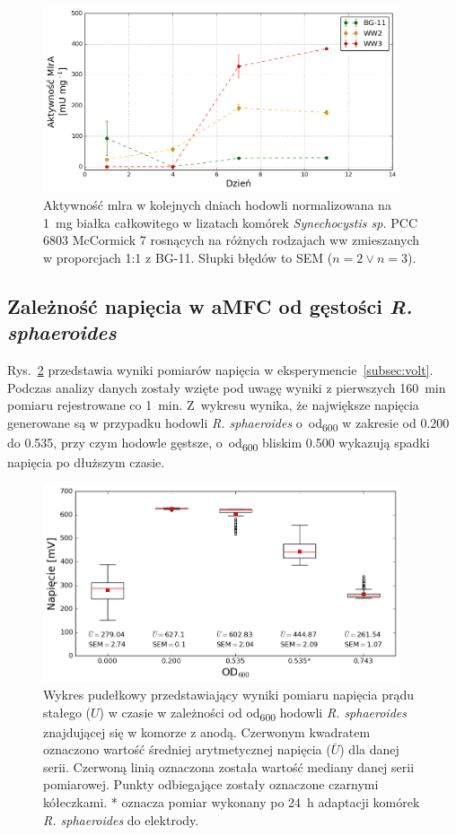 \begin{figure}[h!]
    \centering
    \includegraphics[width=10.5cm]{figures/mlra_activity}
    \caption{
        Aktywność \acrshort{mlra} w kolejnych dniach hodowli
        normalizowana na 1~mg  białka całkowitego w lizatach komórek
        \textit{Synechocystis sp.} PCC 6803 McCormick 7
        rosnących na różnych rodzajach \acrshort{ww} zmieszanych
        w proporcjach 1:1 z BG-11. Słupki błędów to SEM ($n = 2 \vee n = 3$).
    }
    \label{fig:4}
\end{figure}

\subsection{Zależność napięcia w aMFC od gęstości \textit{R. sphaeroides}}\label{subsec:volt2}
Rys.~\ref{fig:3} przedstawia wyniki pomiarów
napięcia w eksperymencie~\ref{subsec:volt}.
Podczas analizy danych zostały wzięte pod uwagę wyniki
z pierwszych 160~min pomiaru rejestrowane co 1~min.
Z~wykresu wynika, że największe napięcia generowane
są w przypadku hodowli \textit{R. sphaeroides}
o~\acrshort{od}\textsubscript{600} w zakresie od 0.200 do 0.535,
przy czym hodowle gęstsze, o~\acrshort{od}\textsubscript{600} bliskim
0.500 wykazują spadki napięcia po dłuższym czasie.

\begin{figure}[h!]
    \centering
    \includegraphics[width=10.5cm]{figures/mfc-volt-boxplt}
    \caption{
        Wykres pudełkowy przedstawiający wyniki pomiaru napięcia prądu stałego ($U$)
        w czasie w zależności od \acrshort{od}\textsubscript{600} hodowli
        \textit{R. sphaeroides} znajdującej się w komorze z anodą.
        Czerwonym kwadratem oznaczono wartość średniej arytmetycznej napięcia
        ($\bar{U}$) dla danej serii.
        Czerwoną linią oznaczona została wartość mediany danej serii pomiarowej.
        Punkty odbiegające zostały oznaczone czarnymi kółeczkami.
        * oznacza pomiar wykonany po 24~h adaptacji komórek
        \textit{R. sphaeroides} do elektrody.
    }
    \label{fig:3}
\end{figure}

